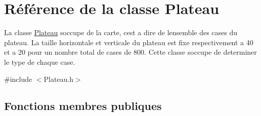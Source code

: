 \hypertarget{classPlateau}{}\section{Référence de la classe Plateau}
\label{classPlateau}


La classe \hyperlink{classPlateau}{Plateau} s\textquotesingle{}occupe de la carte, c\textquotesingle{}est a dire de l\textquotesingle{}ensemble des cases du plateau. La taille horizontale et verticale du plateau est fixe respectivement a 40 et a 20 pour un nombre total de cases de 800. Cette classe s\textquotesingle{}occupe de determiner le type de chaque case.  




{\ttfamily \#include $<$Plateau.\+h$>$}

\subsection*{Fonctions membres publiques}
